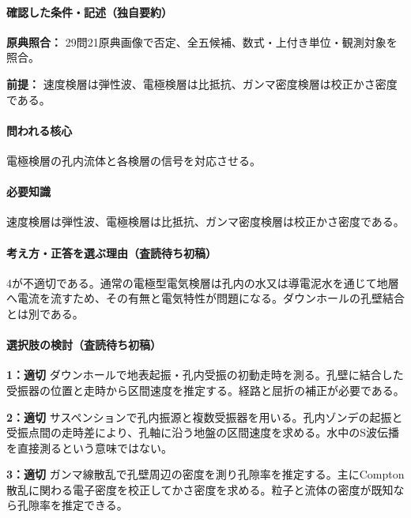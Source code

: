 \paragraph{確認した条件・記述（独自要約）}\mbox{}\par

\noindent\textbf{原典照合：} 29問21原典画像で否定、全五候補、数式・上付き単位・観測対象を照合。\par

\noindent\textbf{前提：} 速度検層は弾性波、電極検層は比抵抗、ガンマ密度検層は校正かさ密度である。\par

\paragraph{問われる核心} 電極検層の孔内流体と各検層の信号を対応させる。

\paragraph{必要知識} 速度検層は弾性波、電極検層は比抵抗、ガンマ密度検層は校正かさ密度である。

\paragraph{考え方・正答を選ぶ理由（査読待ち初稿）} 4が不適切である。通常の電極型電気検層は孔内の水又は導電泥水を通じて地層へ電流を流すため、その有無と電気特性が問題になる。ダウンホールの孔壁結合とは別である。

\paragraph{選択肢の検討（査読待ち初稿）}\mbox{}\par

\noindent\textbf{1：適切} ダウンホールで地表起振・孔内受振の初動走時を測る。孔壁に結合した受振器の位置と走時から区間速度を推定する。経路と屈折の補正が必要である。\par

\noindent\textbf{2：適切} サスペンションで孔内振源と複数受振器を用いる。孔内ゾンデの起振と受振点間の走時差により、孔軸に沿う地盤の区間速度を求める。水中のS波伝播を直接測るという意味ではない。\par

\noindent\textbf{3：適切} ガンマ線散乱で孔壁周辺の密度を測り孔隙率を推定する。主にCompton散乱に関わる電子密度を校正してかさ密度を求める。粒子と流体の密度が既知なら孔隙率を推定できる。\par

